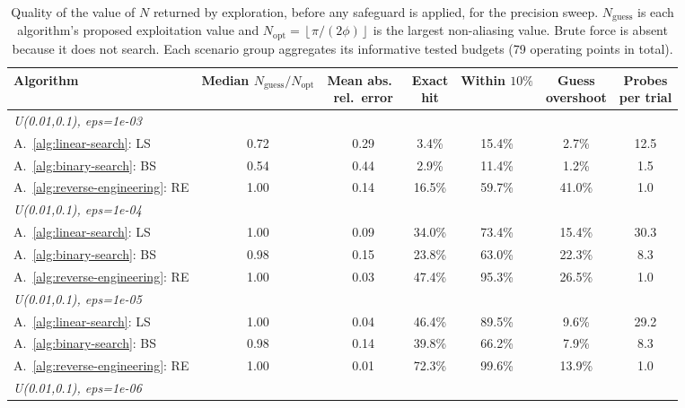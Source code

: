 \begin{table}[ht]
\centering
\small
\caption{Quality of the value of $N$ returned by exploration, before any safeguard is applied, for the precision sweep. $N_{\mathrm{guess}}$ is each algorithm's proposed exploitation value and $N_{\mathrm{opt}}=\left\lfloor\pi/(2\phi)\right\rfloor$ is the largest non-aliasing value. Brute force is absent because it does not search. Each scenario group aggregates its informative tested budgets (79 operating points in total).}
\label{tab:diag-exploration}
\begin{tabular}{lcccccc}
\toprule
Algorithm
& \makecell{Median \\ $N_{\mathrm{guess}}/N_{\mathrm{opt}}$}
& \makecell{Mean abs.\ \\ rel.\ error}
& \makecell{Exact \\ hit}
& \makecell{Within \\ $10\%$}
& \makecell{Guess \\ overshoot}
& \makecell{Probes \\ per trial} \\
\midrule
\multicolumn{7}{l}{\itshape U(0.01,0.1), eps=1e-03} \\
A.~\ref{alg:linear-search}: LS
& 0.72
& 0.29
& 3.4\%
& 15.4\%
& 2.7\%
& 12.5 \\
A.~\ref{alg:binary-search}: BS
& 0.54
& 0.44
& 2.9\%
& 11.4\%
& 1.2\%
& 1.5 \\
A.~\ref{alg:reverse-engineering}: RE
& 1.00
& 0.14
& 16.5\%
& 59.7\%
& 41.0\%
& 1.0 \\
\midrule
\multicolumn{7}{l}{\itshape U(0.01,0.1), eps=1e-04} \\
A.~\ref{alg:linear-search}: LS
& 1.00
& 0.09
& 34.0\%
& 73.4\%
& 15.4\%
& 30.3 \\
A.~\ref{alg:binary-search}: BS
& 0.98
& 0.15
& 23.8\%
& 63.0\%
& 22.3\%
& 8.3 \\
A.~\ref{alg:reverse-engineering}: RE
& 1.00
& 0.03
& 47.4\%
& 95.3\%
& 26.5\%
& 1.0 \\
\midrule
\multicolumn{7}{l}{\itshape U(0.01,0.1), eps=1e-05} \\
A.~\ref{alg:linear-search}: LS
& 1.00
& 0.04
& 46.4\%
& 89.5\%
& 9.6\%
& 29.2 \\
A.~\ref{alg:binary-search}: BS
& 0.98
& 0.14
& 39.8\%
& 66.2\%
& 7.9\%
& 8.3 \\
A.~\ref{alg:reverse-engineering}: RE
& 1.00
& 0.01
& 72.3\%
& 99.6\%
& 13.9\%
& 1.0 \\
\midrule
\multicolumn{7}{l}{\itshape U(0.01,0.1), eps=1e-06} \\

\end{tabular}
\end{table}
